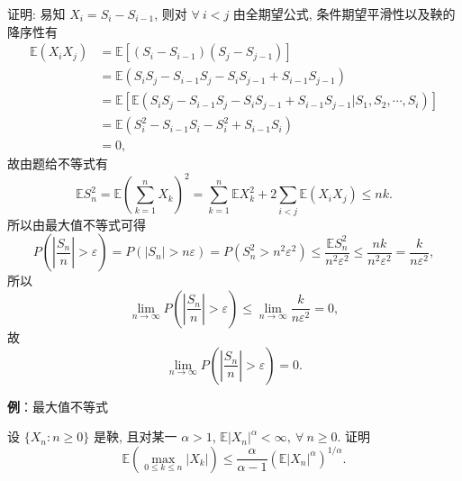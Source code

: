 \documentclass[openany]{ctexbook}
\theoremstyle{kaiti}
\theoremstyle{normal}
\begin{document}
证明: 易知 $X_i=S_i-S_{i-1}$, 则对 $\forall~i< j$ 由全期望公式, 条件期望平滑性以及鞅的降序性有
\begin{equation}
  \begin{aligned}
    \mathbb{E}(X_iX_j)
    &=\mathbb{E}[(S_i-S_{i-1})(S_j-S_{j-1})]\\
    &=\mathbb{E}(S_iS_j-S_{i-1}S_j-S_iS_{j-1}+S_{i-1}S_{j-1})\\
    &=\mathbb{E}[\mathbb{E}(S_iS_j-S_{i-1}S_j-S_iS_{j-1}+S_{i-1}S_{j-1}|S_1,S_2,\cdots,S_i)]\\
    &=\mathbb{E}(S_i^2-S_{i-1}S_i-S_i^2+S_{i-1}S_i)\\
    &=0,
  \end{aligned}
\end{equation}
故由题给不等式有
\begin{equation}
  \mathbb{E}S_n^2=\mathbb{E}\left(\sum_{k=1}^nX_k\right)^2=\sum_{k=1}^n\mathbb{E}X_k^2+2\sum_{i< j}\mathbb{E}(X_iX_j)\leqslant nk.
\end{equation}
所以由最大值不等式可得
\begin{equation}
  P\left(\left|\frac{S_n}{n}\right|>\varepsilon\right)=P(|S_n|>n\varepsilon)=P\left(S_n^2>n^2\varepsilon^2\right)\leqslant\frac{\mathbb{E}S_n^2}{n^2\varepsilon^2}\leqslant\frac{nk}{n^2\varepsilon^2}=\frac{k}{n\varepsilon^2},
\end{equation}
所以
\begin{equation}
  \lim_{n\to\infty}P\left(\left|\frac{S_n}{n}\right|>\varepsilon\right)\leqslant\lim_{n\to\infty}\frac{k}{n\varepsilon^2}=0,
\end{equation}
故
\begin{equation}
  \lim_{n\to\infty}P\left(\left|\frac{S_n}{n}\right|>\varepsilon\right)=0.
\end{equation}

\textbf{例}：最大值不等式

设 $\{X_n:n\geqslant0\}$ 是鞅, 且对某一 $\alpha>1$, $\mathbb{E}|X_n|^\alpha<\infty,~\forall~n\geqslant0$. 证明
\begin{equation}
  \mathbb{E}\left(\max_{0\leqslant k\leqslant n}|X_k|\right)\leqslant\frac{\alpha}{\alpha-1}(\mathbb{E}|X_n|^\alpha)^{1/\alpha}.
\end{equation}
\end{document}
